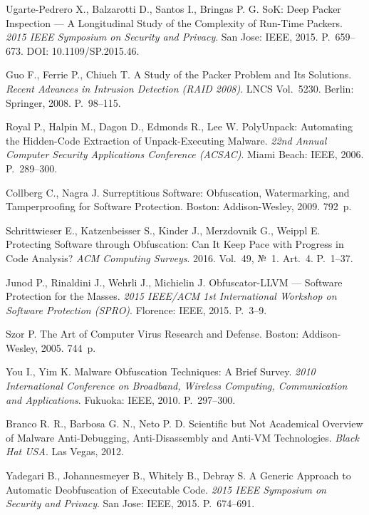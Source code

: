 
 Ugarte-Pedrero X., Balzarotti D., Santos I., Bringas P. G. SoK: Deep Packer Inspection --- A Longitudinal Study of the Complexity of Run-Time Packers. \emph{2015 IEEE Symposium on Security and Privacy}. San Jose: IEEE, 2015. P.~659--673. DOI: 10.1109/SP.2015.46.

 Guo F., Ferrie P., Chiueh T. A Study of the Packer Problem and Its Solutions. \emph{Recent Advances in Intrusion Detection (RAID 2008)}. LNCS Vol.~5230. Berlin: Springer, 2008. P.~98--115.

 Royal P., Halpin M., Dagon D., Edmonds R., Lee W. PolyUnpack: Automating the Hidden-Code Extraction of Unpack-Executing Malware. \emph{22nd Annual Computer Security Applications Conference (ACSAC)}. Miami Beach: IEEE, 2006. P.~289--300.

 Collberg C., Nagra J. Surreptitious Software: Obfuscation, Watermarking, and Tamperproofing for Software Protection. Boston: Addison-Wesley, 2009. 792~p.

 Schrittwieser E., Katzenbeisser S., Kinder J., Merzdovnik G., Weippl E. Protecting Software through Obfuscation: Can It Keep Pace with Progress in Code Analysis? \emph{ACM Computing Surveys}. 2016. Vol.~49, №~1. Art.~4. P.~1--37.

 Junod P., Rinaldini J., Wehrli J., Michielin J. Obfuscator-LLVM --- Software Protection for the Masses. \emph{2015 IEEE/ACM 1st International Workshop on Software Protection (SPRO)}. Florence: IEEE, 2015. P.~3--9.

 Szor P. The Art of Computer Virus Research and Defense. Boston: Addison-Wesley, 2005. 744~p.

 You I., Yim K. Malware Obfuscation Techniques: A Brief Survey. \emph{2010 International Conference on Broadband, Wireless Computing, Communication and Applications}. Fukuoka: IEEE, 2010. P.~297--300.

 Branco R. R., Barbosa G. N., Neto P. D. Scientific but Not Academical Overview of Malware Anti-Debugging, Anti-Disassembly and Anti-VM Technologies. \emph{Black Hat USA}. Las Vegas, 2012.

 Yadegari B., Johannesmeyer B., Whitely B., Debray S. A Generic Approach to Automatic Deobfuscation of Executable Code. \emph{2015 IEEE Symposium on Security and Privacy}. San Jose: IEEE, 2015. P.~674--691.

